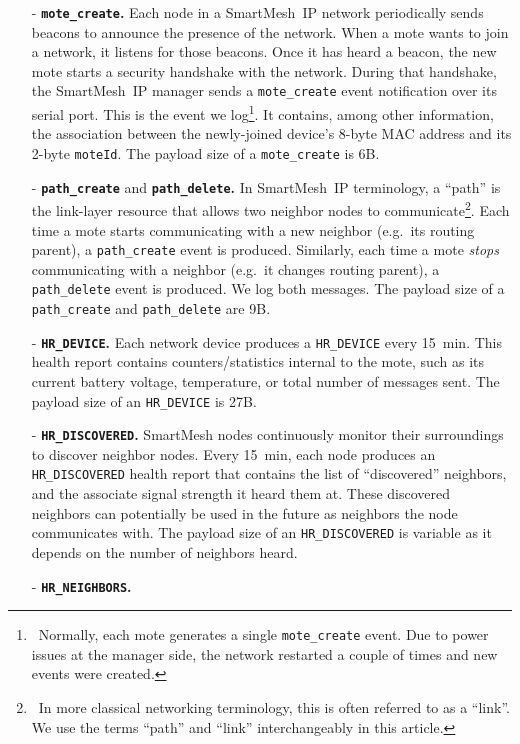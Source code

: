 \documentclass{elsarticle}
\newcommand{\sm}                  {SmartMesh\xspace}
\newcommand{\smip}                {SmartMesh~IP\xspace}
\newcommand{\HRNEIGHBORS}         {{\tt HR\_NEIGHBORS}\xspace}
\newcommand{\HRDISCOVERED}        {{\tt HR\_DISCOVERED}\xspace}
\newcommand{\HRDEVICE}            {{\tt HR\_DEVICE}\xspace}
\newcommand{\pathcreate}          {{\tt path\_create}\xspace}
\newcommand{\pathdelete}          {{\tt path\_delete}\xspace}
\newcommand{\motecreate}          {{\tt mote\_create}\xspace}
\newcommand{\moteId}              {{\tt moteId}\xspace}
\begin{document}
\begin{itemize}
    \item[-] \textbf{\motecreate.}
        Each node in a \smip network periodically sends beacons to announce the presence of the network.
        When a mote wants to join a network, it listens for those beacons.
        Once it has heard a beacon, the new mote starts a security handshake with the network.
        During that handshake, the \smip manager sends a \motecreate event notification over its serial port.
        This is the event we log\footnote{~Normally, each mote generates a single \motecreate event. Due to power issues at the manager side, the network restarted a couple of times and new events were created.}.
        It contains, among other information, the association between the newly-joined device's 8-byte MAC address and its 2-byte \moteId.
        The payload size of a \motecreate is 6B.
    \item[-] \textbf{\pathcreate} and \textbf{\pathdelete.}
        In \smip terminology, a ``path'' is the link-layer resource that allows two neighbor nodes to communicate\footnote{~In more classical networking terminology, this is often referred to as a ``link''. We use the terms ``path'' and ``link'' interchangeably in this article.}.
        Each time a mote starts communicating with a new neighbor (e.g.~its routing parent), a \pathcreate event is produced.
        Similarly, each time a mote \textit{stops} communicating with a neighbor (e.g.~it changes routing parent), a \pathdelete event is produced.
        We log both messages.
        The payload size of a \pathcreate and \pathdelete are 9B.
    \item[-] \textbf{\HRDEVICE.}
        Each network device produces a \HRDEVICE every 15~min.
        This health report contains counters/statistics internal to the mote, such as its current battery voltage, temperature, or total number of messages sent.
        The payload size of an \HRDEVICE is 27B.
    \item[-] \textbf{\HRDISCOVERED.}
        \sm nodes continuously monitor their surroundings to discover neighbor nodes.
        Every 15~min, each node produces an \HRDISCOVERED health report that contains the list of ``discovered'' neighbors, and the associate signal strength it heard them at.
        These discovered neighbors can potentially be used in the future as neighbors the node communicates with.
        The payload size of an \HRDISCOVERED is variable as it depends on the number of neighbors heard.
    \item[-] \textbf{\HRNEIGHBORS.}

\end{itemize}
\end{document}

